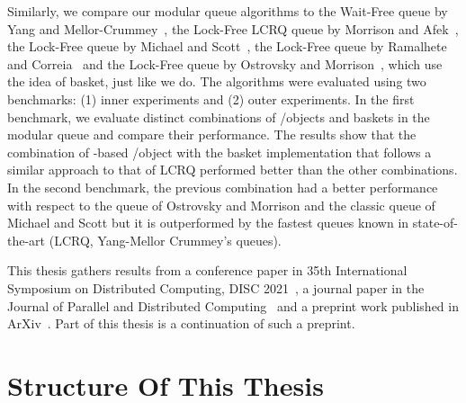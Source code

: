 Similarly, we compare our modular queue algorithms to the Wait-Free queue by Yang and Mellor-Crummey~\cite{DBLP_conf_ppopp_YangM16}, the Lock-Free LCRQ queue by Morrison and Afek~\cite{ppopp2013x86queues}, the Lock-Free queue by Michael and Scott~\cite{DBLP_conf_podc_MichaelS96}, the Lock-Free queue by Ramalhete and Correia~\cite{Ramalhete_Correia_MPMC_2016} and the Lock-Free queue by Ostrovsky and Morrison~\cite{scalingconcurrent2020}, which use the idea of basket, just like we do. The algorithms were evaluated using two benchmarks: (1) inner experiments and (2) outer experiments. In the first benchmark, we evaluate distinct combinations of \LL/\IC objects and baskets in the modular queue and compare their performance. The results show that the combination of \CAS-based \LL/\IC object with the basket implementation that follows a similar approach to that of LCRQ performed better than the other combinations. In the second benchmark, the previous combination had a better performance with respect to the queue of Ostrovsky and Morrison and the classic queue of Michael and Scott but it is outperformed by the fastest queues known in state-of-the-art (LCRQ, Yang-Mellor Crummey's queues).

This thesis gathers results from a conference paper in 35th International Symposium on Distributed Computing, DISC 2021~\cite{DBLP_conf_wdag_CastanedaP21}, a journal paper in the Journal of Parallel and Distributed Computing~\cite{DBLP_journals_jpdc_CastanedaP24} and a preprint work published in ArXiv~\cite{arxiv_2205_06323}. Part of this thesis is a continuation of such a preprint.
\section{\label{section:Organization}Structure Of This Thesis}

